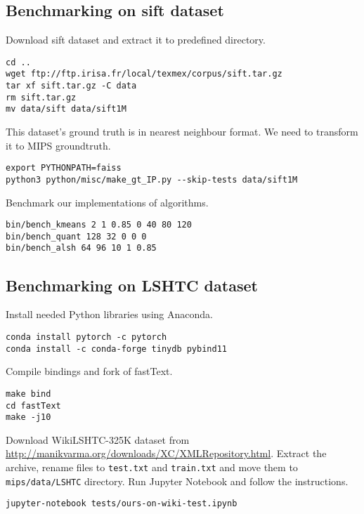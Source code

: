 \subsection{Benchmarking on sift dataset}
\noindent
Download sift dataset and extract it to predefined directory.
\begin{verbatim}
cd ..
wget ftp://ftp.irisa.fr/local/texmex/corpus/sift.tar.gz
tar xf sift.tar.gz -C data
rm sift.tar.gz
mv data/sift data/sift1M
\end{verbatim}
This dataset's ground truth is in nearest neighbour format.
We need to transform it to MIPS groundtruth.
\begin{verbatim}
export PYTHONPATH=faiss
python3 python/misc/make_gt_IP.py --skip-tests data/sift1M
\end{verbatim}
Benchmark our implementations of algorithms.
\begin{verbatim}
bin/bench_kmeans 2 1 0.85 0 40 80 120
bin/bench_quant 128 32 0 0 0
bin/bench_alsh 64 96 10 1 0.85
\end{verbatim}
\subsection{Benchmarking on LSHTC dataset}
\noindent
Install needed Python libraries using Anaconda.
\begin{verbatim}
conda install pytorch -c pytorch
conda install -c conda-forge tinydb pybind11
\end{verbatim}
Compile bindings and fork of fastText.
\begin{verbatim}
make bind
cd fastText
make -j10
\end{verbatim}
Download WikiLSHTC-325K dataset from \url{http://manikvarma.org/downloads/XC/XMLRepository.html}.
Extract the archive, rename files to \texttt{test.txt} and \texttt{train.txt} and move them to \texttt{mips/data/LSHTC} directory.
Run Jupyter Notebook and follow the instructions.
\begin{verbatim}
jupyter-notebook tests/ours-on-wiki-test.ipynb 
\end{verbatim}
